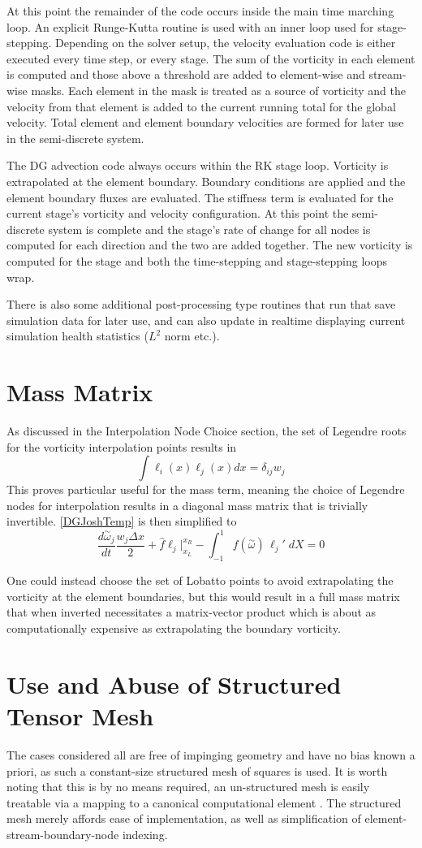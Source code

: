 \documentclass[letterpaper,12pt]{report}
\newcommand{\be}{\begin{equation}}
\newcommand{\ben}[1]{\begin{equation}\label{#1}}
\newcommand{\ee}{\end{equation}}
\newcommand{\aomega}{\overset{\sim}{\omega}}				%
\begin{document}
At this point the remainder of the code occurs inside the main time marching loop. An explicit Runge-Kutta routine is used with an inner loop used for stage-stepping. Depending on the solver setup, the velocity evaluation code is either executed every time step, or every stage. The sum of the vorticity in each element is computed and those above a threshold are added to element-wise and stream-wise masks. Each element in the mask is treated as a source of vorticity and the velocity from that element is added to the current running total for the global velocity. Total element and element boundary velocities are formed for later use in the semi-discrete system.

The DG advection code always occurs within the RK stage loop. Vorticity is extrapolated at the element boundary. Boundary conditions are applied and the element boundary fluxes are evaluated. The stiffness term is evaluated for the current stage's vorticity and velocity configuration. At this point the semi-discrete system is complete and the stage's rate of change for all nodes is computed for each direction and the two are added together. The new vorticity is computed for the stage and both the time-stepping and stage-stepping loops wrap.

There is also some additional post-processing type routines that run that save simulation data for later use, and can also update in realtime displaying current simulation health statistics ($L^2$ norm etc.).
%
\section{Mass Matrix}
As discussed in the Interpolation Node Choice section, the set of Legendre roots for the vorticity interpolation points results in
\be \int \ell_i(x) \ell_j(x) dx = \delta_{ij} w_j \ee
This proves particular useful for the mass term, meaning the choice of Legendre nodes for interpolation results in a diagonal mass matrix that is trivially invertible. \eqref{DGJoshTemp} is then simplified to
\ben{DGJoshTemp2} \frac{d \aomega_j}{dt} \frac{w_j \Delta x}{2}
+\hat{f}\ell_j \Big|^{x_R}_{x_L} 
- \int_{-1}^{1} f(\aomega) \, \ell_j' \;dX = 0 \ee

One could instead choose the set of Lobatto points to avoid extrapolating the vorticity at the element boundaries, but this would result in a full mass matrix that when inverted necessitates a matrix-vector product which is about as computationally expensive as extrapolating the boundary vorticity.
%
\section{Use and Abuse of Structured Tensor Mesh}
The cases considered all are free of impinging geometry and have no bias known a priori, as such a constant-size structured mesh of squares is used. It is worth noting that this is by no means required, an un-structured mesh is easily treatable via a mapping to a canonical computational element \cite{Persson2013}. The structured mesh merely affords ease of implementation, as well as simplification of element-stream-boundary-node indexing.
\end{document}
